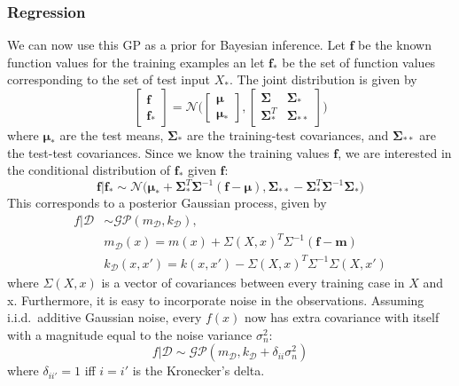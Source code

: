 \documentclass{article}
\begin{document}
\subsubsection{Regression}
We can now use this GP as a prior for Bayesian inference. Let $\mathbf{f}$ be the known function values for the training examples an let $\mathbf{f}_*$ be the set of function values corresponding to the set of test input $X_*$. The joint distribution is given by
\begin{equation*}
\begin{bmatrix} \mathbf{f} \\ \mathbf{f}_* \end{bmatrix} 
= 
\mathcal{N}\Big(\begin{bmatrix} \mathbf{\mu} \\ \mathbf{\mu}_* \end{bmatrix}, \begin{bmatrix}\mathbf{\Sigma} & \mathbf{\Sigma}_* \\ \mathbf{\Sigma}_*^T & \mathbf{\Sigma}_{**} \end{bmatrix} \Big)
\end{equation*}
where $\mathbf{\mu}_*$ are the test means, $\mathbf{\Sigma}_*$ are the training-test covariances, and $\mathbf{\Sigma}_{**}$ are the test-test covariances. Since we know the training values $\mathbf{f}$, we are interested in the conditional distribution of $\mathbf{f}_*$ given $\mathbf{f}$:
\begin{equation*}
	\mathbf{f} \big\vert \mathbf{f}_* \sim
	\mathcal{N} \big( \mathbf{\mu}_* + \mathbf{\Sigma}_*^T \mathbf{\Sigma}^{-1}(\mathbf{f}-\mathbf{\mu}), \mathbf{\Sigma}_{**} - \mathbf{\Sigma}^T_*\mathbf{\Sigma}^{-1}\mathbf{\Sigma}_* \big)
\end{equation*}
This corresponds to a posterior Gaussian process, given by
\begin{align*}
	f \big\vert \mathcal{D} &\sim \mathcal{GP}(m_\mathcal{D}, k_\mathcal{D}), \\
	& m_\mathcal{D}(x) = m(x) + \Sigma(X,x)^T\Sigma^{-1}(\mathbf{f}-\mathbf{m})\\
	& k_\mathcal{D}(x, x') = k(x, x') - \Sigma(X,x)^T\Sigma^{-1}\Sigma(X, x')
\end{align*}
where $\Sigma(X, x)$ is a vector of covariances between every training case in $X$ and x. Furthermore, it is easy to incorporate noise in the observations. Assuming i.i.d.\ additive Gaussian noise, every $f(x)$ now has extra covariance with itself with a magnitude equal to the noise variance $\sigma_n^2$:
\begin{equation*}
	f \big\vert \mathcal{D} \sim \mathcal{GP}(m_\mathcal{D}, k_\mathcal{D} + \delta_{ii} \sigma_n^2)
\end{equation*}
where $\delta_{ii'} = 1$ iff $i=i'$ is the Kronecker's delta.
\end{document}
